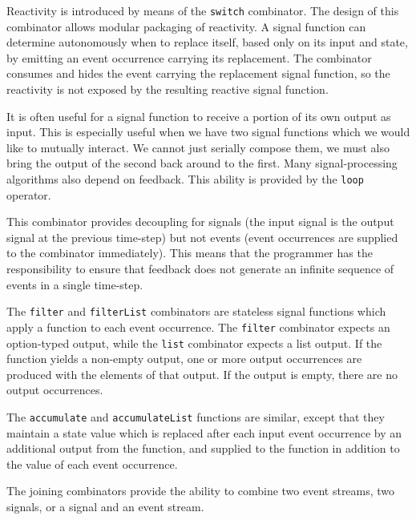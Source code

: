 Reactivity is introduced by means of the {\tt switch} combinator.
The design of this combinator
allows modular packaging of reactivity. A signal function can determine
autonomously when to replace itself, based only on its input and state,
by emitting an event occurrence carrying its replacement. The combinator
consumes and hides the event carrying the replacement signal function, 
so the reactivity is not exposed by the resulting reactive signal function.

It is often useful for a signal function to receive a portion of its
own output as input. This is especially useful when we have two
signal functions which we would like to mutually interact. We cannot
just serially compose them, we must also bring the output of the second
back around to the first. Many signal-processing algorithms also depend
on feedback. This ability is provided by the {\tt loop} operator. 

This combinator provides decoupling for signals
(the input signal is the output signal at the previous time-step)
but not events (event occurrences are supplied to the combinator immediately).
This means that the programmer has the responsibility to ensure that feedback
does not generate an infinite sequence of events in a single time-step.

The {\tt filter} and {\tt filterList} combinators are stateless signal functions
which apply a function to each event occurrence. The {\tt filter} combinator
expects an option-typed output, while the {\tt list} combinator expects a list
output.  If the function yields a non-empty output, one or more output occurrences
are produced with the elements of that output. If the output is empty, there
are no output occurrences.

The {\tt accumulate} and {\tt accumulateList} functions are similar, except that
they maintain a state value which is replaced after each input event occurrence
by an additional output from the function, and supplied to the function in
addition to the value of each event occurrence. 

The joining combinators provide the ability to combine two event
streams, two signals, or a signal and an event stream. 

